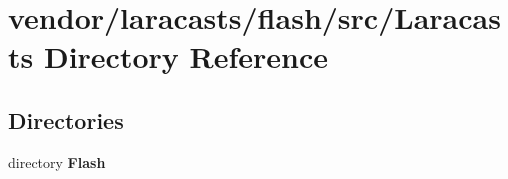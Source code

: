 \section{vendor/laracasts/flash/src/\+Laracasts Directory Reference}
\label{dir_5c8a54baea3ec41b9f9671278bd33f59}
\subsection*{Directories}
\begin{DoxyCompactItemize}
\item 
directory {\bf Flash}
\end{DoxyCompactItemize}
